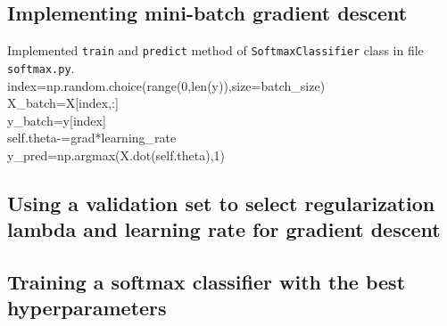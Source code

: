 \documentclass{article}
\begin{document}
\subsection{Implementing mini-batch gradient descent}
Implemented \verb|train| and \verb|predict| method of \verb|SoftmaxClassifier| class in file \verb|softmax.py|.\\[10pt]
index=np.random.choice(range(0,len(y)),size=batch\_size)\\
      X\_batch=X[index,:]\\
      y\_batch=y[index]\\[8pt]
      self.theta-=grad*learning\_rate\\[8pt]
          y\_pred=np.argmax(X.dot(self.theta),1)\\[10pt]
\subsection{Using a validation set to select regularization lambda and learning rate for gradient descent}
\subsection{Training a softmax classifier with the best hyperparameters}
\end{document}
